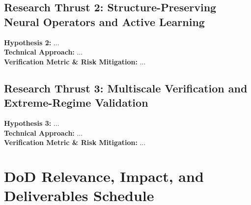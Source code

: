 \documentclass[11pt]{article}
\begin{document}
\subsection{Research Thrust 2: Structure-Preserving Neural Operators and Active Learning}
\noindent\textbf{Hypothesis 2:} ... \\
\textbf{Technical Approach:} ... \\
\textbf{Verification Metric \& Risk Mitigation:} ...

\subsection{Research Thrust 3: Multiscale Verification and Extreme-Regime Validation}
\noindent\textbf{Hypothesis 3:} ... \\
\textbf{Technical Approach:} ... \\
\textbf{Verification Metric \& Risk Mitigation:} ...

\section{DoD Relevance, Impact, and Deliverables Schedule}
\end{document}

